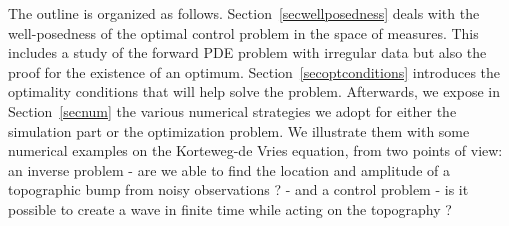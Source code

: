 The outline is organized as follows. Section~\ref{secwellposedness} deals with the well-posedness of the optimal control problem in the space of measures. This includes a study of the forward PDE problem with irregular data but also the proof for the existence of an optimum. Section~\ref{secoptconditions} introduces the optimality conditions that will help solve the problem. Afterwards, we expose in Section~\ref{secnum} the various numerical strategies we adopt for either the simulation part or the optimization problem. We illustrate them with some numerical examples on the Korteweg-de Vries equation, from two points of view: an inverse problem - are we able to find the location and amplitude of a topographic bump from noisy observations ? -  and a control problem - is it possible to create a wave in finite time while acting on the topography ?

